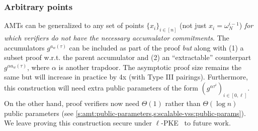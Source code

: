 \subsubsection{Arbitrary points}
\label{s:amt:arbitrary-points}
AMTs can be generalized to any set of points $\{x_i\}_{i\in[n]}$ (not just $x_i=\omega_N^{i-1}$) \textit{for which verifiers do not have the necessary accumulator commitments}.
The accumulators $g^{a_{w}(\tau)}$ can be included as part of the proof \textit{but} along with (1) a subset proof w.r.t. the parent accumulator and (2) an ``extractable'' counterpart $g^{\alpha a_w(\tau)}$, where $\alpha$ is another trapdoor.
The asymptotic proof size remains the same but will increase in practice by 4x (with Type III pairings).
Furthermore, this construction will need extra public parameters of the form $(g^{\alpha \tau^i})_{i\in[0,\ell]}$.
On the other hand, proof verifiers now need $\Theta(1)$ rather than $\Theta(\log{n})$ public parameters (see \cref{s:amt:public-parameters,s:scalable-vss:public-params}).
We leave proving this construction secure under $\ell$-PKE~\cite{groth10} to future work.

